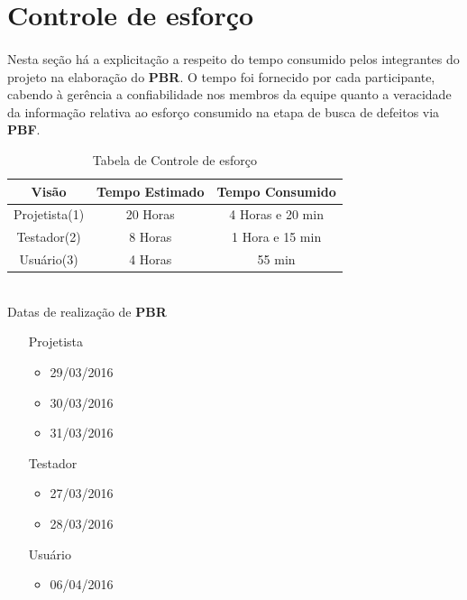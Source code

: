 \documentclass[12pt,a4paper]{article}
\begin{document}
	\section{Controle de esforço}
	\paragraph{} Nesta seção há a explicitação a respeito do tempo consumido pelos integrantes do projeto na elaboração do \textbf{PBR}. O tempo foi fornecido por cada participante, cabendo à gerência a confiabilidade nos membros da equipe quanto a veracidade da informação relativa ao esforço consumido na etapa de busca de defeitos via \textbf{PBF}.
	\vspace{0.45cm}
		\begin{table}[ht]
		 \centering
	\begin{tabular}{||c|c|c||}\hline
		\textbf{Visão} & \textbf{Tempo Estimado} & \textbf{Tempo Consumido} \\ \hline
		Projetista(1) & 20 Horas & 4 Horas e 20 min \\ \hline
		Testador(2) & 8 Horas & 1 Hora e 15 min \\ \hline
		Usuário(3) & 4 Horas & 55 min \\ \hline
	\end{tabular} 
	\caption{Tabela de Controle de esforço}

	\end{table} \\
	Datas de realização de  \textbf{PBR}
	\begin{itemize}
		\item[Projetista]\begin{itemize}
			\item 29/03/2016
			\item 30/03/2016
			\item 31/03/2016
		\end{itemize}
		\item[Testador]\begin{itemize}
			\item 27/03/2016
			\item 28/03/2016
		\end{itemize}
		\item[Usuário]\begin{itemize}
			\item 06/04/2016
		\end{itemize}
	
	\end{itemize}		
\end{document}
